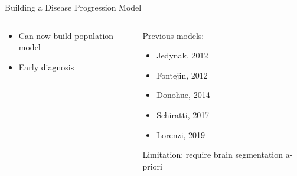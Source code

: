 \begin{frame}{Building a Disease Progression Model}

\begin{columns}
\begin{column}{0.80\textwidth}
 
\begin{center}
\begin{overprint}
 
 
 
 
 
 
 
 
 
 
\end{overprint}
\end{center}

\begin{itemize}
 \item Can now build population model
 \item Early diagnosis
\end{itemize}
\end{column}
\begin{column}[t]{0.2\textwidth}
\vspace{-8em}

 Previous models:
 \begin{itemize}
 \item Jedynak, 2012
 \item Fontejin, 2012 
 \item Donohue, 2014
 \item Schiratti, 2017
 \item Lorenzi, 2019
\end{itemize}

\vspace{2em}

 Limitation: require brain segmentation a-priori

\end{column}


\end{columns}



\end{frame}



